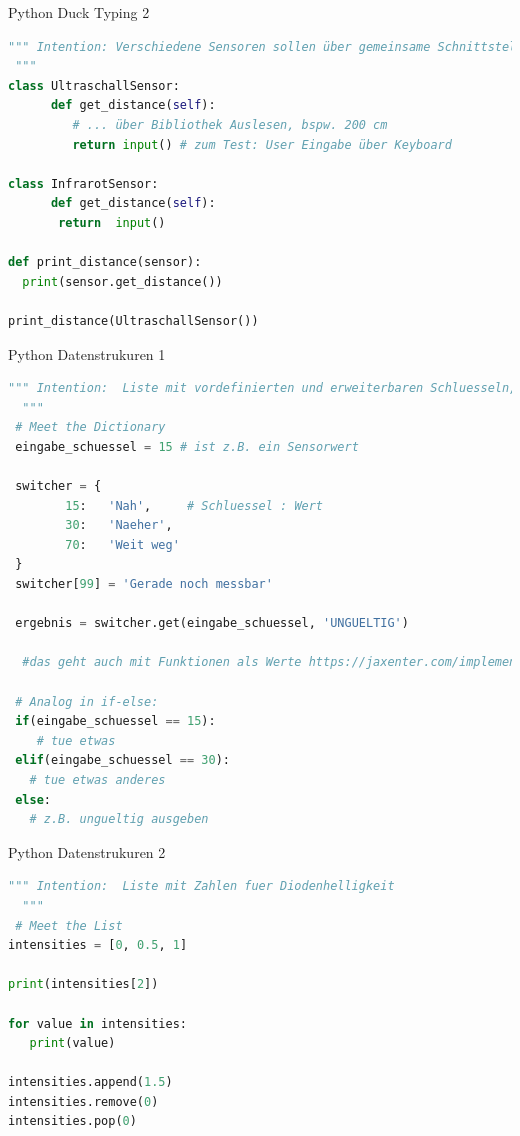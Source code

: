 \begin{frame}[fragile]{Python Duck Typing 2}
\begin{lstlisting}[language=Python]
 """ Intention: Verschiedene Sensoren sollen über gemeinsame Schnittstelle die Distanz zurückliefern
 """
class UltraschallSensor:
	  def get_distance(self):
	     # ... über Bibliothek Auslesen, bspw. 200 cm
	     return input() # zum Test: User Eingabe über Keyboard

class InfrarotSensor:
	  def get_distance(self):
	   return  input()

def print_distance(sensor):
  print(sensor.get_distance())

print_distance(UltraschallSensor())

\end{lstlisting}
\end{frame}


\begin{frame}[fragile]{Python Datenstrukuren 1}
\begin{lstlisting}[language=Python]
 """ Intention:  Liste mit vordefinierten und erweiterbaren Schluesseln, Format aehnlich zu Java Script Object Literals
  """
 # Meet the Dictionary
 eingabe_schuessel = 15 # ist z.B. ein Sensorwert

 switcher = {
        15:   'Nah',     # Schluessel : Wert
        30:   'Naeher',
        70:   'Weit weg'
 }
 switcher[99] = 'Gerade noch messbar'

 ergebnis = switcher.get(eingabe_schuessel, 'UNGUELTIG')

  #das geht auch mit Funktionen als Werte https://jaxenter.com/implement-switch-case-statement-python-138315.html

 # Analog in if-else:
 if(eingabe_schuessel == 15):
    # tue etwas
 elif(eingabe_schuessel == 30):
   # tue etwas anderes
 else:
   # z.B. ungueltig ausgeben


\end{lstlisting}
\end{frame}

\begin{frame}[fragile]{Python Datenstrukuren 2}
\begin{lstlisting}[language=Python]
 """ Intention:  Liste mit Zahlen fuer Diodenhelligkeit
  """
 # Meet the List
intensities = [0, 0.5, 1]

print(intensities[2])

for value in intensities:
   print(value)

intensities.append(1.5)
intensities.remove(0)
intensities.pop(0)


\end{lstlisting}
\end{frame}


